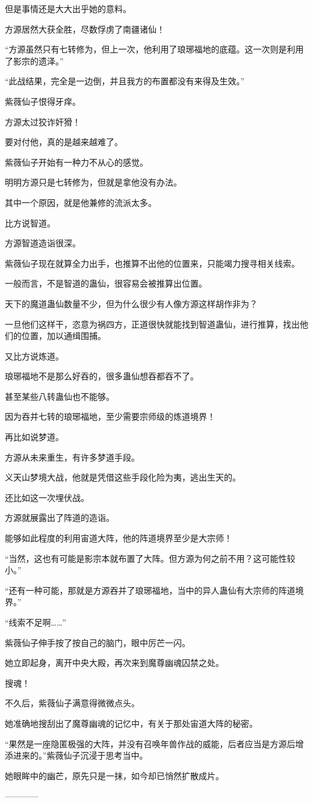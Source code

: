 \begin{this_body}
但是事情还是大大出乎她的意料。

方源居然大获全胜，尽数俘虏了南疆诸仙！

“方源虽然只有七转修为，但上一次，他利用了琅琊福地的底蕴。这一次则是利用了影宗的遗泽。”

“此战结果，完全是一边倒，并且我方的布置都没有来得及生效。”

紫薇仙子恨得牙痒。

方源太过狡诈奸猾！

要对付他，真的是越来越难了。

紫薇仙子开始有一种力不从心的感觉。

明明方源只是七转修为，但就是拿他没有办法。

其中一个原因，就是他兼修的流派太多。

比方说智道。

方源智道造诣很深。

紫薇仙子现在就算全力出手，也推算不出他的位置来，只能竭力搜寻相关线索。

一般而言，不是智道的蛊仙，很容易会被推算出位置。

天下的魔道蛊仙数量不少，但为什么很少有人像方源这样胡作非为？

一旦他们这样干，恣意为祸四方，正道很快就能找到智道蛊仙，进行推算，找出他们的位置，加以通缉围捕。

又比方说炼道。

琅琊福地不是那么好吞的，很多蛊仙想吞都吞不了。

甚至某些八转蛊仙也不能够。

因为吞并七转的琅琊福地，至少需要宗师级的炼道境界！

再比如说梦道。

方源从未来重生，有许多梦道手段。

义天山梦境大战，他就是凭借这些手段化险为夷，逃出生天的。

还比如这一次埋伏战。

方源就展露出了阵道的造诣。

能够如此程度的利用宙道大阵，他的阵道境界至少是大宗师！

“当然，这也有可能是影宗本就布置了大阵。但方源为何之前不用？这可能性较小。”

“还有一种可能，那就是方源吞并了琅琊福地，当中的异人蛊仙有大宗师的阵道境界。”

“线索不足啊……”

紫薇仙子伸手按了按自己的脑门，眼中厉芒一闪。

她立即起身，离开中央大殿，再次来到魔尊幽魂囚禁之处。

搜魂！

不久后，紫薇仙子满意得微微点头。

她准确地搜刮出了魔尊幽魂的记忆中，有关于那处宙道大阵的秘密。

“果然是一座隐匿极强的大阵，并没有召唤年兽作战的威能，后者应当是方源后增添进来的。”紫薇仙子沉浸于思考当中。

她眼眸中的幽芒，原先只是一抹，如今却已悄然扩散成片。

------------

\end{this_body}

